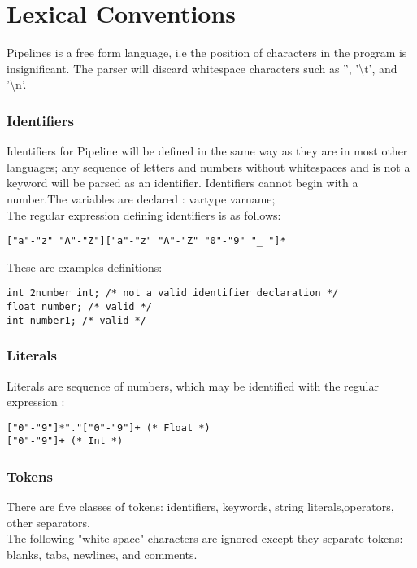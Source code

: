 \documentclass[./LRM_main.tex]{subfiles}
\begin{document}
\section{Lexical Conventions}

Pipelines is a free form language, i.e the position of characters in the program is insignificant. The parser will discard whitespace characters such as '', '\textbackslash t', and '\textbackslash n'. 

\subsubsection{Identifiers}
Identifiers for Pipeline will be defined in the same way as they are in most other languages; any sequence of letters and numbers without whitespaces and is not a keyword will be parsed as an identifier. Identifiers cannot begin with a number.The variables are declared : vartype varname;  \\
The regular expression defining identifiers is as follows:  

\begin{lstlisting}
["a"-"z" "A"-"Z"]["a"-"z" "A"-"Z" "0"-"9" "_ "]*
\end{lstlisting}

These are examples definitions:

\begin{lstlisting}
int 2number int; /* not a valid identifier declaration */ 
float number; /* valid */ 
int number1; /* valid */
\end{lstlisting}

\subsubsection{Literals}
Literals are sequence of numbers, which may be identified with the regular expression : 
\begin{lstlisting}
["0"-"9"]*"."["0"-"9"]+ (* Float *)
["0"-"9"]+ (* Int *) 
\end{lstlisting}

\subsubsection{Tokens}
There are five classes of tokens:
identifiers, keywords, string literals,operators, other separators.\\
The following "white space" characters are ignored except they separate tokens: blanks, tabs, newlines, and comments.\\
\end{document}
